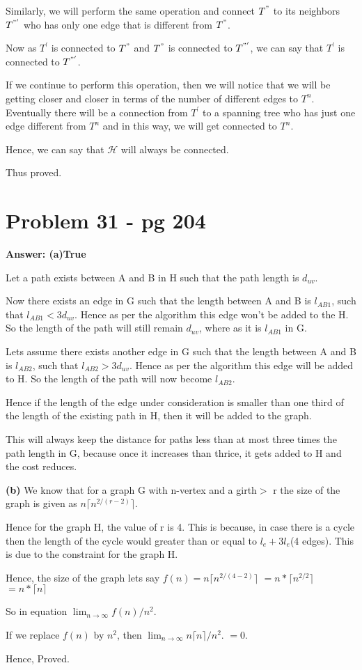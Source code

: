 \documentclass[12pt]{article}
\begin{document}
Similarly, we will perform the same operation and connect $T^{"} $  to its neighbors $T^{"'} $ who has only one edge that is different from $T^{"} $.

Now as $T^{'} $ is connected to $T^{"} $ and $T^{"} $ is connected to $T^{"'} $, we can say that $T^{'} $ is connected to $T^{"'} $.

If we continue to perform this operation, then we will notice that we will be getting closer and closer in terms of the number of different edges to $T^{n} $. Eventually there will be a connection from $T^{'} $ to a spanning tree who has just one edge different from $T^{n} $ and in this way, we will get connected to $T^{n} $.

Hence, we can say that $\mathcal{H}$ will always be connected. 

Thus proved.


\section{Problem 31 - pg 204}
\textbf{Answer:
(a)True}

Let a path exists between A and B in H such that the path length is $d_{uv}$.

Now there exists an edge in G such that the length between A and B is $l_{AB1}$, such that $l_{AB1}  < 3  d_{uv}$. Hence as per the algorithm this edge won't be added to the H. So the length of the path will still remain  $d_{uv}$, where as it is $l_{AB1}$ in G.

Lets assume there exists another edge in G such that the length between A and B is $l_{AB2}$, such that $l_{AB2}  > 3  d_{uv}$. Hence as per the algorithm this edge will be added to H. So the length of the path will now become $l_{AB2}$.

Hence if the length of the edge under consideration is smaller than one third of the length of the existing path in H, then it will be added to the graph. 

This will always keep the distance  for paths less than at most three times the path length in G, because once it increases than thrice, it gets added to H and the cost reduces.

\textbf{(b)}
We know that for a graph G with n-vertex and a girth$ > $ r the size of the graph is given as $n\lceil n^{2/(r-2)}\rceil $.

Hence for the graph H, the value of r is 4. This is because, in case there is a cycle then the length of the cycle would greater than or equal to $l_e + 3l_e$(4 edges). This is due to the constraint for the graph H. 

Hence, the size of the graph lets say $f(n) = n\lceil n^{2/(4-2)}\rceil $
$=n*\lceil n^{2/2}\rceil$
$=n*\lceil n\rceil$

So in equation 
$\lim_{n \to \infty} f(n)/n^2$.

If we replace $f(n)$ by $n^2$,
then $\lim_{n \to \infty} n \lceil n \rceil /n^2$.
$= 0.$

Hence, Proved.
\end{document}
